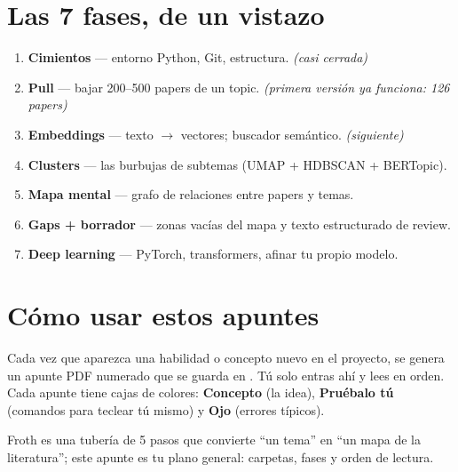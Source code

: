 \documentclass[11pt,a4paper]{article}
\begin{document}
\section{Las 7 fases, de un vistazo}

\begin{enumerate}
  \item[\textbf{F0}] \textbf{Cimientos} --- entorno Python, Git, estructura. \emph{(casi cerrada)}
  \item[\textbf{F1}] \textbf{Pull} --- bajar 200--500 papers de un topic. \emph{(primera versión ya funciona: 126 papers)}
  \item[\textbf{F2}] \textbf{Embeddings} --- texto $\rightarrow$ vectores; buscador semántico. \emph{(siguiente)}
  \item[\textbf{F3}] \textbf{Clusters} --- las burbujas de subtemas (UMAP + HDBSCAN + BERTopic).
  \item[\textbf{F4}] \textbf{Mapa mental} --- grafo de relaciones entre papers y temas.
  \item[\textbf{F5}] \textbf{Gaps + borrador} --- zonas vacías del mapa y texto estructurado de review.
  \item[\textbf{F6}] \textbf{Deep learning} --- PyTorch, transformers, afinar tu propio modelo.
\end{enumerate}

\section{Cómo usar estos apuntes}

Cada vez que aparezca una habilidad o concepto nuevo en el proyecto, se genera un apunte
PDF numerado que se guarda en . Tú solo entras ahí y lees en orden.
Cada apunte tiene cajas de colores: \textcolor{litblue}{\textbf{Concepto}} (la idea),
\textcolor{litgreen}{\textbf{Pruébalo tú}} (comandos para teclear tú mismo) y
\textcolor{litorange}{\textbf{Ojo}} (errores típicos).

\begin{resumen}
Froth es una tubería de 5 pasos que convierte ``un tema'' en ``un mapa de la literatura'';
este apunte es tu plano general: carpetas, fases y orden de lectura.
\end{resumen}
\end{document}
